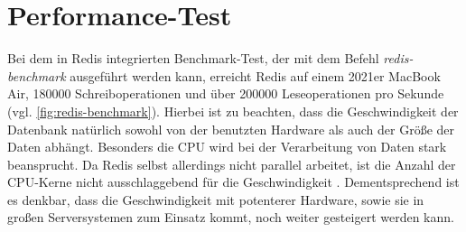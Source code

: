 
\section{Performance-Test}
\label{sec:Performance}
Bei dem in Redis integrierten Benchmark-Test, der mit dem Befehl \textit{redis-benchmark} ausgeführt werden kann, erreicht Redis auf einem 2021er MacBook Air, 180000 Schreiboperationen und über 200000 Leseoperationen pro Sekunde (vgl. \autoref{fig:redis-benchmark}).
Hierbei ist zu beachten, dass die Geschwindigkeit der Datenbank natürlich sowohl von der benutzten Hardware als auch der Größe der Daten abhängt.
Besonders die CPU wird bei der Verarbeitung von Daten stark beansprucht. Da Redis selbst allerdings nicht parallel arbeitet, ist die Anzahl der CPU-Kerne nicht ausschlaggebend für die Geschwindigkeit \cite{Redis-Docs-Benchmarks}.
Dementsprechend ist es denkbar, dass die Geschwindigkeit mit potenterer Hardware, sowie sie in großen Serversystemen zum Einsatz kommt, noch weiter gesteigert werden kann.
